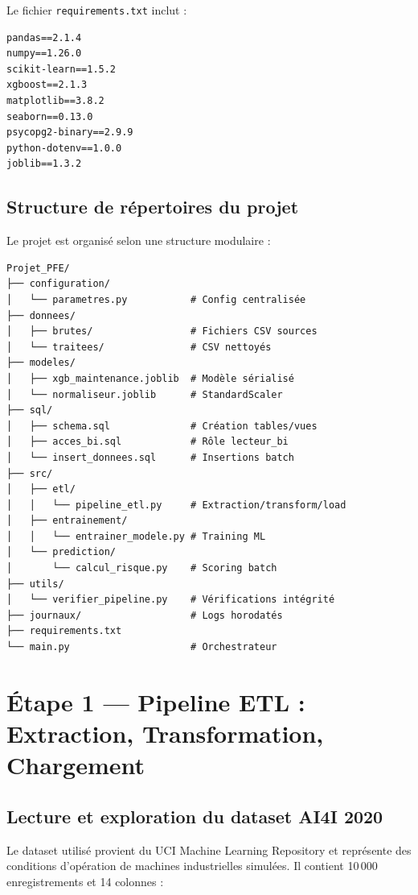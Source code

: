 \documentclass[a4paper,12pt,twoside]{report}
\begin{document}
Le fichier \texttt{requirements.txt} inclut :

\begin{lstlisting}
pandas==2.1.4
numpy==1.26.0
scikit-learn==1.5.2
xgboost==2.1.3
matplotlib==3.8.2
seaborn==0.13.0
psycopg2-binary==2.9.9
python-dotenv==1.0.0
joblib==1.3.2
\end{lstlisting}

\subsection{Structure de répertoires du projet}

Le projet est organisé selon une structure modulaire :

\begin{verbatim}
Projet_PFE/
├── configuration/
│   └── parametres.py           # Config centralisée
├── donnees/
│   ├── brutes/                 # Fichiers CSV sources
│   └── traitees/               # CSV nettoyés
├── modeles/
│   ├── xgb_maintenance.joblib  # Modèle sérialisé
│   └── normaliseur.joblib      # StandardScaler
├── sql/
│   ├── schema.sql              # Création tables/vues
│   ├── acces_bi.sql            # Rôle lecteur_bi
│   └── insert_donnees.sql      # Insertions batch
├── src/
│   ├── etl/
│   │   └── pipeline_etl.py     # Extraction/transform/load
│   ├── entrainement/
│   │   └── entrainer_modele.py # Training ML
│   └── prediction/
│       └── calcul_risque.py    # Scoring batch
├── utils/
│   └── verifier_pipeline.py    # Vérifications intégrité
├── journaux/                   # Logs horodatés
├── requirements.txt
└── main.py                     # Orchestrateur
\end{verbatim}

\section{Étape 1 — Pipeline ETL : Extraction, Transformation, Chargement}

\subsection{Lecture et exploration du dataset AI4I 2020}

Le dataset utilisé provient du UCI Machine Learning Repository et représente des conditions d'opération de machines industrielles simulées. Il contient 10\,000 enregistrements et 14 colonnes :
\end{document}
